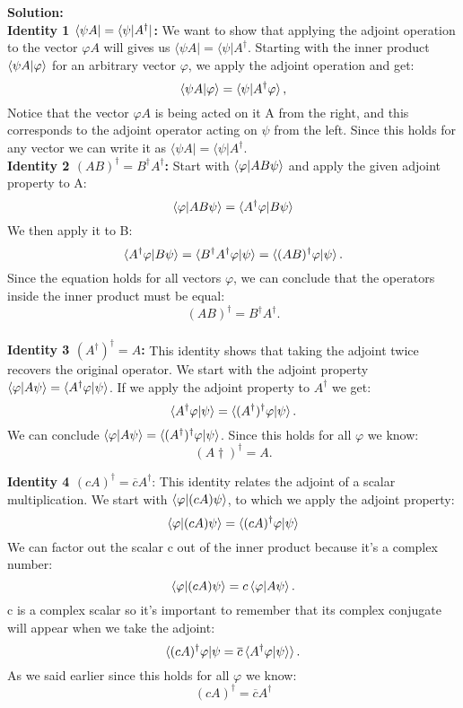 \documentclass{article}
\renewcommand{\phi}{\varphi}
\theoremstyle{plain}
\numberwithin{thm}{section}
\theoremstyle{definition}
\begin{document}
\begin{enumerate}
    \textbf{Solution:}\\
    \textbf{Identity 1 $\bra{\psi A}=\bra{\psi|A^\dagger}$:} We want to show that applying the adjoint operation to the vector $\varphi A$ will gives us $\langle \psi A| = \langle \psi|A^\dagger$. Starting with the inner product $\braket{\psi A|\phi}$ for an arbitrary vector $\phi$, we apply the adjoint operation and get: $$\braket{\psi A|\phi}=\braket{\psi|A^\dagger \phi},$$ Notice that the vector $\phi A$ is being acted on it A from the right, and this corresponds to the adjoint operator acting on $\psi$ from the left. Since this holds for any vector we can write it as $\langle \psi A| = \langle \psi|A^\dagger$.\\
    
    \textbf{Identity 2 $(AB)^\dagger = B^\dagger A^\dagger$:} Start with $\braket{\phi|AB\psi}$ and apply the given adjoint property to A: $$\braket{\phi|AB\psi}=\braket{A^\dagger\phi|B\psi}$$
    We then apply it to B: $$\braket{A^\dagger\phi|B\psi}=\braket{B^\dagger A^\dagger \phi|\psi}= \braket{(AB)^\dagger \phi|\psi}.$$ Since the equation holds for all vectors $\phi$, we can conclude that the operators inside the inner product must be equal: $$(AB)^\dagger=B^\dagger A^\dagger.$$\\

    \textbf{Identity 3 $(A^\dagger)^\dagger =A$:} This identity shows that taking the adjoint twice recovers the original operator. We start with the adjoint property $\braket{\phi|A\psi}=\braket{A^\dagger \phi|\psi}$. If we apply the adjoint property to $A^\dagger$ we get: $$\braket{A^\dagger \phi|\psi} = \braket{(A^\dagger)^\dagger \phi|\psi}.$$ We can conclude $\braket{\phi|A\psi}=\braket{(A^\dagger)^\dagger \phi|\psi}$. Since this holds for all $\phi$ we know: $$(A\dagger)^\dagger=A.$$

    \textbf{Identity 4 $(cA)^\dagger = \overline{c}A^\dagger$}: This identity relates the adjoint of a scalar multiplication. We start with $\braket{\phi|(cA)\psi}$, to which we apply the adjoint property: $$\braket{\phi|(cA)\psi}= \braket{(cA)^\dagger \phi|\psi}$$ We can factor out the scalar c out of the inner product because it's a complex number: $$\braket{\phi|(cA)\psi}=c\braket{\phi|A\psi}.$$ c is a complex scalar so it's important to remember that its complex conjugate will appear when we take the adjoint: $$\braket{(cA)^\dagger \phi|\psi=\overline{c}\braket{A^\dagger \phi|\psi}}.$$ As we said earlier since this holds for all $\phi$ we know: $$(cA)^\dagger=\overline{c}A^\dagger$$
    


\end{enumerate}
\end{document}
